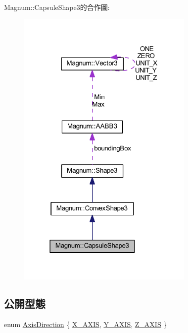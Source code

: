 Magnum\+:\+:Capsule\+Shape3的合作圖\+:\nopagebreak
\begin{figure}[H]
\begin{center}
\leavevmode
\includegraphics[width=243pt]{class_magnum_1_1_capsule_shape3__coll__graph}
\end{center}
\end{figure}
\subsection*{公開型態}
\begin{DoxyCompactItemize}
\item 
enum \hyperlink{class_magnum_1_1_capsule_shape3_a3dec6b2f3ea7c02e2c3db53d94652fca}{Axis\+Direction} \{ \hyperlink{class_magnum_1_1_capsule_shape3_a3dec6b2f3ea7c02e2c3db53d94652fcaa20a067dba6b2b7e38dfa04d7dc0fe5c5}{X\+\_\+\+A\+X\+IS}, 
\hyperlink{class_magnum_1_1_capsule_shape3_a3dec6b2f3ea7c02e2c3db53d94652fcaa1d767bc9a2876cb283e1f0fc2829bbbd}{Y\+\_\+\+A\+X\+IS}, 
\hyperlink{class_magnum_1_1_capsule_shape3_a3dec6b2f3ea7c02e2c3db53d94652fcaa55f5f6acfbcb42f0cf283fbc4d1c236e}{Z\+\_\+\+A\+X\+IS}
 \}
\end{DoxyCompactItemize}
